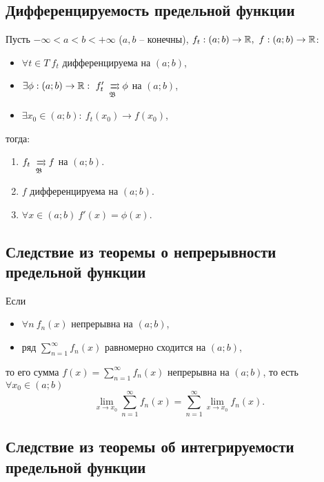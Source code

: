 \subsection{Дифференцируемость предельной функции}

\begin{theorem}\label{theorem:6.9.5}
    Пусть $ -\infty < a < b < +\infty $ ($ a,b $ -- конечны), $ f_t: (a;b)\rightarrow\R, \ f:(a;b) \rightarrow \R $:
    \begin{itemize}
        \item $ \forall t \in T \ f_t $ дифференцируема на $ (a;b) $,
        \item $ \exists \phi: (a;b)\rightarrow\R: \ f_t' \xrightrightarrows[\mathfrak{B}]{} \phi $ на $ (a;b) $,
        \item $ \exists x_0 \in (a;b): \ f_t(x_0) \rightarrow f(x_0) $,
    \end{itemize}
    тогда:
    \begin{enumerate}
        \item $ f_t \xrightrightarrows[\mathfrak{B}]{} f $ на $ (a;b) $.
        \item $ f $ дифференцируема на $ (a;b) $.
        \item $ \forall x \in (a;b) \ f'(x) = \phi(x) $.
    \end{enumerate}
\end{theorem}

\subsection{Следствие из теоремы о непрерывности предельной функции}

\begin{corollary}
    Если
    \begin{itemize}
        \item $\forall n \ f_n(x)$ непрерывна на $(a;b)$,
        \item ряд $\sum_{n = 1}^{\infty} f_n(x)$ равномерно сходится на $(a;b)$,
    \end{itemize}
    то его сумма $f(x) = \sum_{n=1}^{\infty}f_n(x)$ непрерывна на $(a;b)$, то есть $\forall x_0 \in (a;b)$
    \[
        \underset{x\rightarrow x_0}{\lim}\sum_{n=1}^{\infty}f_n(x) = \sum_{n=1}^{\infty}\underset{x\rightarrow x_0}{\lim}f_n(x).
    \]
\end{corollary}

\subsection{Следствие из теоремы об интегрируемости предельной функции}

